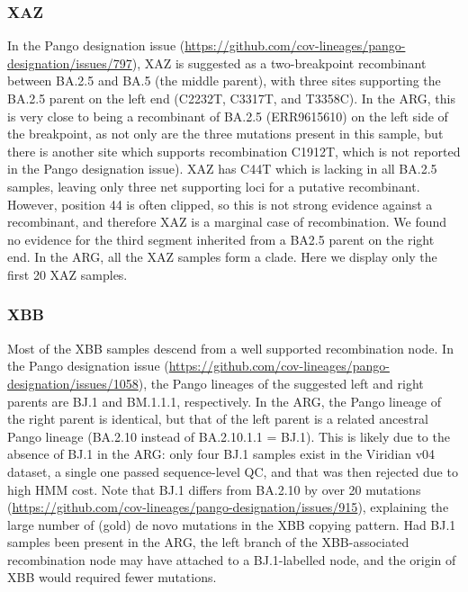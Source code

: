 \documentclass[12pt]{article}
\begin{document}

\subsubsection{XAZ}
\label{sec:dd_xaz}

In the Pango designation issue
(\url{https://github.com/cov-lineages/pango-designation/issues/797}),
XAZ is suggested as a two-breakpoint recombinant between
BA.2.5 and BA.5 (the middle parent),
with three sites supporting the BA.2.5 parent
on the left end (C2232T, C3317T, and T3358C).
In the ARG, this is very close to being a recombinant of
BA.2.5 (ERR9615610) on the left side of the breakpoint,
as not only are the three mutations present in this sample,
but there is another site which supports recombination
C1912T, which is not reported in the Pango designation issue).
XAZ has C44T which is lacking in all BA.2.5 samples,
leaving only three net supporting loci for a putative recombinant.
However, position 44 is often clipped,
so this is not strong evidence against a recombinant, and
therefore XAZ is a marginal case of recombination.
We found no evidence for the third segment
inherited from a BA2.5 parent on the right end.
In the ARG, all the XAZ samples form a clade.
Here we display only the first 20 XAZ samples.


\subsubsection{XBB}
\label{sec:dd_xbb}

Most of the XBB samples descend from a well supported recombination node.
In the Pango designation issue
(\url{https://github.com/cov-lineages/pango-designation/issues/1058}),
the Pango lineages of the suggested left and right parents are
BJ.1 and BM.1.1.1, respectively.
In the ARG, the Pango lineage of the right parent is identical,
but that of the left parent is a related ancestral Pango lineage
(BA.2.10 instead of BA.2.10.1.1 = BJ.1).
This is likely due to the absence of BJ.1 in the ARG:
only four BJ.1 samples exist in the Viridian v04 dataset,
a single one passed sequence-level QC, and
that was then rejected due to high HMM cost.
Note that BJ.1 differs from BA.2.10 by over 20 mutations
(\url{https://github.com/cov-lineages/pango-designation/issues/915}),
explaining the large number of (gold) de novo mutations
in the XBB copying pattern.
Had BJ.1 samples been present in the ARG,
the left branch of
the XBB-associated recombination node
may have attached to a BJ.1-labelled node, and
the origin of XBB would required fewer mutations.
\end{document}
